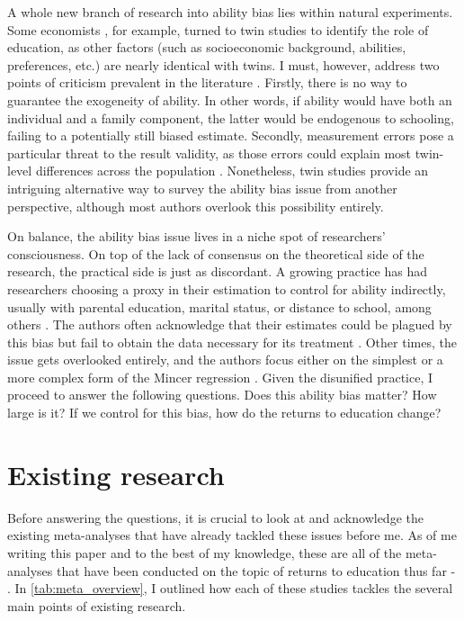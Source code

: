 A whole new branch of research into ability bias lies within natural experiments. Some economists \citep{ashenfelter1994estimates, berman2003language}, for example, turned to twin studies to identify the role of education, as other factors (such as socioeconomic background, abilities, preferences, etc.) are nearly identical with twins. I must, however, address two points of criticism prevalent in the literature \citep{kenayathulla2013higher}. Firstly, there is no way to guarantee the exogeneity of ability. In other words, if ability would have both an individual and a family component, the latter would be endogenous to schooling, failing to a potentially still biased estimate. Secondly, measurement errors pose a particular threat to the result validity, as those errors could explain most twin-level differences across the population \citep{ashenfelter1999review}. Nonetheless, twin studies provide an intriguing alternative way to survey the ability bias issue from another perspective, although most authors overlook this possibility entirely.

On balance, the ability bias issue lives in a niche spot of researchers' consciousness. On top of the lack of consensus on the theoretical side of the research, the practical side is just as discordant. A growing practice has had researchers choosing a proxy in their estimation to control for ability indirectly, usually with parental education, marital status, or distance to school, among others \citep{blundell2001estimating}. The authors often acknowledge that their estimates could be plagued by this bias but fail to obtain the data necessary for its treatment \citep{agrawal2012returns, debrauw2008reconciling}. Other times, the issue gets overlooked entirely, and the authors focus either on the simplest or a more complex form of the Mincer regression \citep{angrist1995economic, sinning2017gender}. Given the disunified practice, I proceed to answer the following questions. Does this ability bias matter? How large is it? If we control for this bias, how do the returns to education change?

\section{Existing research}
\label{sec:existing}

Before answering the questions, it is crucial to look at and acknowledge the existing meta-analyses that have already tackled these issues before me. As of me writing this paper and to the best of my knowledge, these are all of the meta-analyses that have been conducted on the topic of returns to education thus far - \cite{ psacharopoulos1994meta, fleisher2005meta, churchill2018meta, psacharopoulos2018meta, patrinos2020meta, cui2021meta, iwasaki2021meta, ma2021meta, wincenciak2022meta, horie2023meta}. In \autoref{tab:meta_overview}, I outlined how each of these studies tackles the several main points of existing research.

